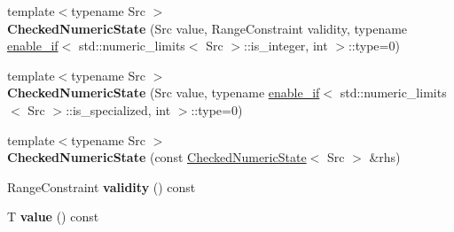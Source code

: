 \begin{DoxyCompactItemize}
\item 
{\footnotesize template$<$typename Src $>$ }\\{\bfseries Checked\+Numeric\+State} (Src value, Range\+Constraint validity, typename \hyperlink{structv8_1_1base_1_1internal_1_1enable__if}{enable\+\_\+if}$<$ std\+::numeric\+\_\+limits$<$ Src $>$\+::is\+\_\+integer, int $>$\+::type=0)\hypertarget{classv8_1_1base_1_1internal_1_1_checked_numeric_state_3_01_t_00_01_n_u_m_e_r_i_c___f_l_o_a_t_i_n_g_01_4_a9b8cfdde69fe925db58b7ffaeac4ec37}{}\label{classv8_1_1base_1_1internal_1_1_checked_numeric_state_3_01_t_00_01_n_u_m_e_r_i_c___f_l_o_a_t_i_n_g_01_4_a9b8cfdde69fe925db58b7ffaeac4ec37}

\item 
{\footnotesize template$<$typename Src $>$ }\\{\bfseries Checked\+Numeric\+State} (Src value, typename \hyperlink{structv8_1_1base_1_1internal_1_1enable__if}{enable\+\_\+if}$<$ std\+::numeric\+\_\+limits$<$ Src $>$\+::is\+\_\+specialized, int $>$\+::type=0)\hypertarget{classv8_1_1base_1_1internal_1_1_checked_numeric_state_3_01_t_00_01_n_u_m_e_r_i_c___f_l_o_a_t_i_n_g_01_4_aa7e847241abcd0a9d98b71c8b7b79b98}{}\label{classv8_1_1base_1_1internal_1_1_checked_numeric_state_3_01_t_00_01_n_u_m_e_r_i_c___f_l_o_a_t_i_n_g_01_4_aa7e847241abcd0a9d98b71c8b7b79b98}

\item 
{\footnotesize template$<$typename Src $>$ }\\{\bfseries Checked\+Numeric\+State} (const \hyperlink{classv8_1_1base_1_1internal_1_1_checked_numeric_state}{Checked\+Numeric\+State}$<$ Src $>$ \&rhs)\hypertarget{classv8_1_1base_1_1internal_1_1_checked_numeric_state_3_01_t_00_01_n_u_m_e_r_i_c___f_l_o_a_t_i_n_g_01_4_a2aabd9445b3a36be3220f685000d4579}{}\label{classv8_1_1base_1_1internal_1_1_checked_numeric_state_3_01_t_00_01_n_u_m_e_r_i_c___f_l_o_a_t_i_n_g_01_4_a2aabd9445b3a36be3220f685000d4579}

\item 
Range\+Constraint {\bfseries validity} () const \hypertarget{classv8_1_1base_1_1internal_1_1_checked_numeric_state_3_01_t_00_01_n_u_m_e_r_i_c___f_l_o_a_t_i_n_g_01_4_a063a660f95bdf875ef256236e322ef9c}{}\label{classv8_1_1base_1_1internal_1_1_checked_numeric_state_3_01_t_00_01_n_u_m_e_r_i_c___f_l_o_a_t_i_n_g_01_4_a063a660f95bdf875ef256236e322ef9c}

\item 
T {\bfseries value} () const \hypertarget{classv8_1_1base_1_1internal_1_1_checked_numeric_state_3_01_t_00_01_n_u_m_e_r_i_c___f_l_o_a_t_i_n_g_01_4_a210fa3e010f0849187d3ffe97a9413db}{}\label{classv8_1_1base_1_1internal_1_1_checked_numeric_state_3_01_t_00_01_n_u_m_e_r_i_c___f_l_o_a_t_i_n_g_01_4_a210fa3e010f0849187d3ffe97a9413db}

\end{DoxyCompactItemize}
